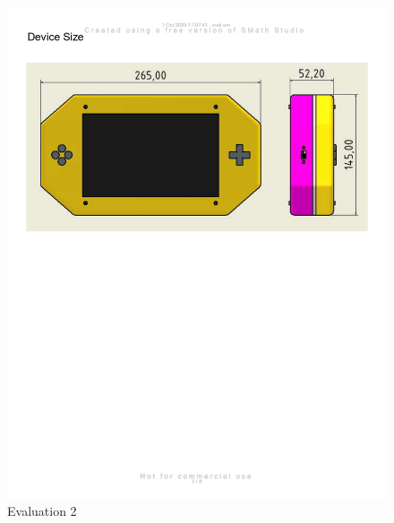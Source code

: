 \begin{figure}[H]
    \centering
    \includegraphics[width=\linewidth]{texs/appendix/data/evaluation/eval_page-0002.jpg}
    \caption{Evaluation 2}
    \label{fig:evaluation-2}
\end{figure}

